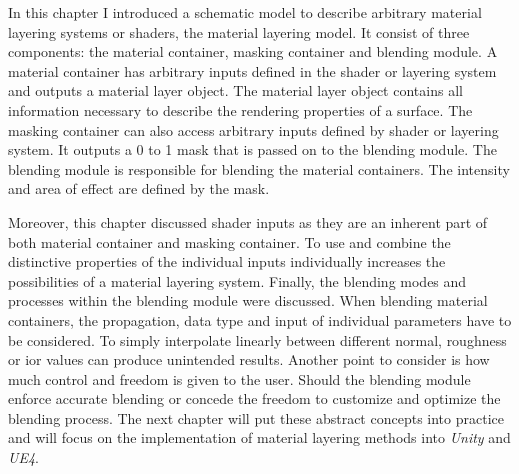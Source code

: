 In this chapter I introduced a schematic model to describe arbitrary material layering systems or shaders, the material layering model. It consist of three components: the material container, masking container and blending module. A material container has  arbitrary inputs defined in the shader or layering system and outputs a material layer object. The material layer object contains all information necessary to describe the rendering properties of a surface. The masking container can also access arbitrary inputs defined by shader or layering system. It outputs a 0 to 1 mask that is passed on to the blending module. The blending module is responsible for blending the material containers. The intensity and area of effect are defined by the mask.

Moreover, this chapter discussed shader inputs as they are an inherent part of both material container and masking container. To use and combine the distinctive properties of the individual inputs individually increases the possibilities of a material layering system. Finally, the blending modes and processes within the blending module were discussed. When blending material containers, the propagation, data type and input of individual parameters have to be considered. To simply interpolate linearly between different normal, roughness or ior values can produce unintended results. Another point to consider is how much control and freedom is given to the user. Should the blending module enforce accurate blending or concede the freedom to customize and optimize the blending process. The next chapter will put these abstract concepts into practice and will focus on the implementation of material layering methods into \emph{Unity} and \emph{UE4}.

